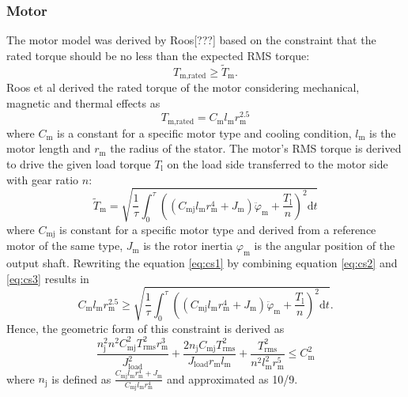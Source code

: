\subsubsection*{Motor}
The motor model was derived by Roos[???] based on the constraint that the rated torque should be no less than the expected RMS torque:
\begin{equation} \label{eq:cs1}
T_{\text{m,rated}} \geq \tilde{T}_{\text{m}}.
\end{equation}
Roos et al derived the rated torque of the motor considering mechanical, magnetic and thermal effects as
\begin{equation} \label{eq:cs2}
T_{\text{m,rated}}=C_{\text{m}}l_{\text{m}} r_{\text{m}}^{2.5}
\end{equation}
where $C_{\text{m}}$ is a constant for a specific motor type and cooling condition, $l_{\text{m}}$ is the motor length and $r_{\text{m}}$ the radius of the stator. The motor$’$s RMS torque is derived to drive the given load torque $T_{\text{l}}$ on the load side transferred to the motor side with gear ratio $n$:
\begin{equation} \label{eq:cs3}
\tilde{T}_{\text{m}}=\sqrt{\frac{1}{\tau}\int_0^\tau ((C_{\text{mj}}l_{\text{m}} r_{\text{m}}^{4}+J_{\text{m}})\ddot{\varphi}_{\text{m}}+\frac{T_{\text{l}}}{n})^2  \mathrm{d} t}
\end{equation}
where $C_{\text{mj}}$ is constant for a specific motor type and derived from a reference motor of the same type, $J_{\text{m}}$ is the rotor inertia ${\varphi}_{\text{m}}$ is the angular position of the output shaft.
Rewriting the equation \ref{eq:cs1} by combining equation \ref{eq:cs2} and \ref{eq:cs3} results in
\begin{equation} \label{eq:cs4}
C_{\text{m}}l_{\text{m}} r_{\text{m}}^{2.5}\geq \sqrt{\frac{1}{\tau}\int_0^\tau ((C_{\text{mj}}l_{\text{m}} r_{\text{m}}^{4}+J_{\text{m}})\ddot{\varphi}_{\text{m}}+\frac{T_{\text{l}}}{n})^2  \mathrm{d} t}.
\end{equation}
Hence, the geometric form of this constraint is derived as
\begin{equation} \label{eq:cs5}
\frac{n_{\text{j}}^2 n^2 C_{\text{mj}}^2 T_{\text{rms}}^2 r_{\text{m}}^3}{J_{\text{load}}^2} + \frac{2 n_{\text{j}} C_{\text{mj}} T_{\text{rms}}^2}{J_{\text{load}} r_{\text{m}} l_{\text{m}}} + \frac{T_{\text{rms}}^2}{n^2 l_{\text{m}}^2 r_{\text{m}}^5}\leq C_{\text{m}}^2
\end{equation}
where $n_{\text{j}}$ is defined as $\frac{C_{\text{mj}}l_{\text{m}} r_{\text{m}}^{4}+J_{\text{m}}}{C_{\text{mj}}l_{\text{m}} r_{\text{m}}^{4}}$ and approximated as 10/9. 

